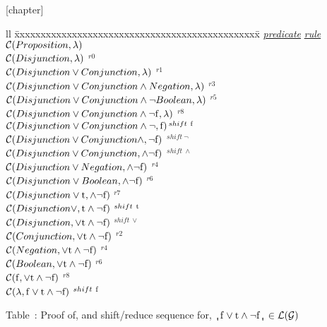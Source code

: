\begin{enumerate}
{}[chapter]
\setcounter{GrammarProofAgain}{\value{table}}
\begin{tabbing}{ll}
\quad\quad\quad\quad\=
xxxxxxxxxxxxxxxxxxxxxxxxxxxxxxxxxxxxxxxxxxxxxxx\=\kill
\>\quad \underline{\em predicate}               \>\underline{\em rule}      \\
\>$\mbox{$\cal C$}(Proposition,\lambda)$                                             \\
\>$\mbox{$\cal C$}(Disjunction,\lambda)$                                \>$^{r0}$    \\
\>$\mbox{$\cal C$}(Disjunction\vee Conjunction, \lambda)$               \>$^{r1}$    \\
\>$\mbox{$\cal C$}(Disjunction\vee Conjunction \wedge Negation, \lambda)$ \>$^{r3}$  \\
\>$\mbox{$\cal C$}(Disjunction\vee Conjunction\wedge\neg Boolean, \lambda)$ \>$^{r5}$\\
\>$\mbox{$\cal C$}(Disjunction\vee Conjunction\wedge\neg\rm f, \lambda)$    \>$^{r8}$\\
\>$\mbox{$\cal C$}(Disjunction\vee Conjunction\wedge\neg,\rm f)$\>$^{shift\ \rm f}$  \\
\>$\mbox{$\cal C$}(Disjunction\vee Conjunction\wedge,\neg\rm f)$ \>$^{shift\ \neg}$  \\
\>$\mbox{$\cal C$}(Disjunction\vee Conjunction,\wedge\neg\rm f)$ \>$^{shift\ \wedge}$\\
\>$\mbox{$\cal C$}(Disjunction\vee Negation,\wedge\neg\rm f)$              \>$^{r4}$ \\
\>$\mbox{$\cal C$}(Disjunction\vee Boolean,\wedge\neg\rm f)$               \>$^{r6}$ \\
\>$\mbox{$\cal C$}(Disjunction\vee\rm t,\wedge\neg f)$                     \>$^{r7}$ \\
\>$\mbox{$\cal C$}(Disjunction\vee,\rm t\wedge\neg f)$         \>$^{shift\ \rm t}$   \\
\>$\mbox{$\cal C$}(Disjunction,\vee\rm t\wedge\neg f)$            \>$^{shift\ \vee}$ \\
\>$\mbox{$\cal C$}(Conjunction,\vee\rm t\wedge\neg f)$                     \>$^{r2}$ \\
\>$\mbox{$\cal C$}(Negation,\vee\rm t\wedge\neg f)$                        \>$^{r4}$ \\
\>$\mbox{$\cal C$}(Boolean,\vee\rm t\wedge\neg f)$                         \>$^{r6}$ \\
\>$\mbox{$\cal C$}(\rm f,\vee t\wedge\neg f)$                              \>$^{r8}$ \\
\>$\mbox{$\cal C$}(\rm\lambda,f\vee t \wedge\neg f)$          \>$^{shift\ \rm f}$
\end{tabbing}
\begin{center}
Table~\thetable: 
Proof of, and shift/reduce sequence for,
$\sq{\rm f}\vee{\rm t}\wedge\neg{\rm f}\sq \in \cal L(G)$
\end{center}


\end{enumerate}
